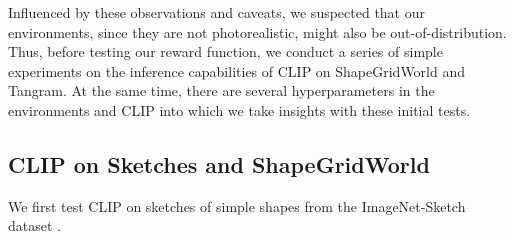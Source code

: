 Influenced by these observations and caveats, we suspected that our environments, since they are not photorealistic, might also be out-of-distribution. 
Thus, before testing our reward function, we conduct a series of simple experiments on the inference capabilities of CLIP on ShapeGridWorld and Tangram.
At the same time, there are several hyperparameters in the environments and CLIP into which we take insights with these initial tests.


\subsection{CLIP on Sketches and ShapeGridWorld}
\label{sec:clip-sketches}

We first test CLIP on sketches of simple shapes from the ImageNet-Sketch dataset \citep{imagenet}.

